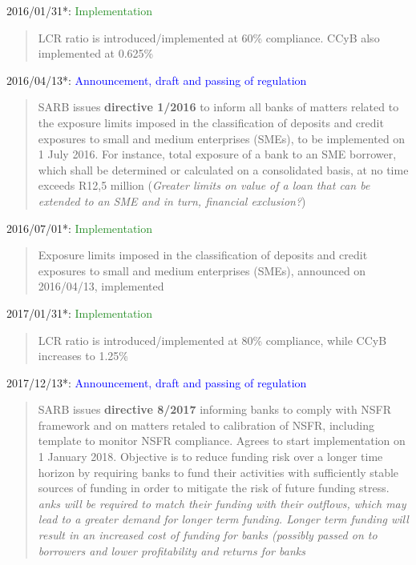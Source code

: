 \documentclass[
  letterpaper,
  DIV=11,
  numbers=noendperiod]{scrartcl}
\begin{document}
2016/01/31*: \textcolor{ForestGreen}{Implementation}

\begin{quote}
LCR ratio is introduced/implemented at 60\% compliance. CCyB also implemented at 0.625\% 
\end{quote}

2016/04/13*:
\textcolor{blue}{Announcement, draft and passing of regulation}

\begin{quote}
SARB issues \textbf{directive 1/2016} to inform all banks of matters related to the exposure limits imposed in the classification of deposits and credit exposures to small and medium enterprises  (SMEs), to be implemented on 1 July 2016. For instance, total exposure of a bank to an SME borrower, which shall be determined or calculated on a consolidated basis, at no time exceeds R12,5 million (\textit{Greater limits on value of a loan that can be extended to an SME and in turn, financial exclusion?})
\end{quote}

2016/07/01*: \textcolor{ForestGreen}{Implementation}

\begin{quote}
Exposure limits imposed in the classification of deposits and credit exposures to small and medium enterprises  (SMEs), announced on 2016/04/13, implemented
\end{quote}

2017/01/31*: \textcolor{ForestGreen}{Implementation}

\begin{quote}
LCR ratio is introduced/implemented at 80\% compliance, while CCyB increases to 1.25\%
\end{quote}

2017/12/13*:
\textcolor{blue}{Announcement, draft and passing of regulation}

\begin{quote}
SARB issues \textbf{directive 8/2017} informing banks to comply with NSFR framework and on matters retaled to calibration of NSFR, including  template to monitor NSFR compliance. Agrees to start implementation on 1 January 2018. Objective is to reduce funding risk over a longer time horizon by requiring banks to fund their activities with sufficiently stable sources of funding in order to mitigate the risk of future funding stress. \textit{anks will be required to match their funding with their outflows, which may lead to a greater demand for longer term funding. Longer term funding will result in an increased cost of funding for banks (possibly passed on to borrowers and lower profitability and returns for banks}
\end{quote}
\end{document}
